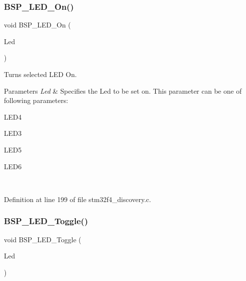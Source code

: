 \subsubsection{\texorpdfstring{B\+S\+P\+\_\+\+L\+E\+D\+\_\+\+On()}{BSP\_LED\_On()}}
{\footnotesize\ttfamily void B\+S\+P\+\_\+\+L\+E\+D\+\_\+\+On (\begin{DoxyParamCaption}\item[{Led\+\_\+\+Type\+Def}]{Led }\end{DoxyParamCaption})}



Turns selected L\+ED On. 


\begin{DoxyParams}{Parameters}
{\em Led} & Specifies the Led to be set on. This parameter can be one of following parameters\+: \begin{DoxyItemize}
\item L\+E\+D4 \item L\+E\+D3 \item L\+E\+D5 \item L\+E\+D6 \end{DoxyItemize}
\\
\hline
\end{DoxyParams}


Definition at line 199 of file stm32f4\+\_\+discovery.\+c.

\mbox{\label{group___s_t_m32_f4___d_i_s_c_o_v_e_r_y___l_o_w___l_e_v_e_l___exported___functions_ga1b9eabba7d498f41d6f16587ec0f9732}} 
\subsubsection{\texorpdfstring{B\+S\+P\+\_\+\+L\+E\+D\+\_\+\+Toggle()}{BSP\_LED\_Toggle()}}
{\footnotesize\ttfamily void B\+S\+P\+\_\+\+L\+E\+D\+\_\+\+Toggle (\begin{DoxyParamCaption}\item[{Led\+\_\+\+Type\+Def}]{Led }\end{DoxyParamCaption})}



